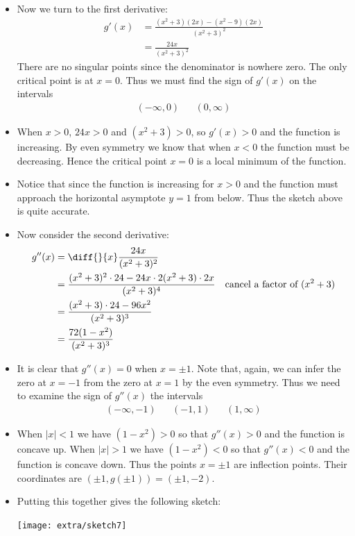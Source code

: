 \begin{eg}
\begin{itemize}
\item Now we turn to the first derivative:
\begin{align*}
  g'(x) &= \frac{(x^2+3)(2x) - (x^2-9)(2x)}{(x^2+3)^2}\\
  &= \frac{24x}{(x^2+3)^2}
\end{align*}
There are no singular points since the denominator is nowhere zero. The only critical
point is at $x=0$. Thus we must find the sign of $g'(x)$ on the intervals
\begin{align*}
  (-\infty,0) && (0,\infty)
\end{align*}
\item When $x>0$, $24x>0$ and $(x^2+3)>0$, so $g'(x)>0$ and the function is increasing.
By even symmetry we know that when $x<0$ the function must be decreasing. Hence the
critical point $x=0$ is a local minimum of the function.
\item Notice that since the function is increasing for $x>0$ and the function must
approach the horizontal asymptote $y=1$ from below. Thus the sketch above is quite
accurate.

\item Now consider the second derivative:
\begin{align*}
  g''(x) &= \diff{}{x} \frac{24x}{(x^2+3)^2}\\
  &= \frac{(x^2+3)^2 \cdot 24 - 24x\cdot 2 (x^2+3)\cdot2x}{(x^2+3)^4} & \text{cancel a
factor of $(x^2+3)$}\\
  &= \frac{(x^2+3) \cdot 24 - 96x^2}{(x^2+3)^3} \\
  &= \frac{72(1-x^2)}{(x^2+3)^3}
\end{align*}
\item It is clear that $g''(x) = 0$ when $x=\pm 1$. Note that, again, we can infer
the zero at $x=-1$ from the zero at $x=1$ by the even symmetry.  Thus we need to examine
the sign of $g''(x)$ the intervals
\begin{align*}
  (-\infty,-1)&&(-1,1)&&(1,\infty)
\end{align*}
\item When $|x|<1$ we have $(1-x^2)>0$ so that $g''(x)>0$ and the function is
concave up. When $|x|>1$ we have $(1-x^2)<0$ so that $g''(x)<0$ and the function is
concave down. Thus the points $x=\pm 1$ are inflection points. Their coordinates are
$(\pm1, g(\pm1)) =(\pm 1,-2)$.

\item Putting this together gives the following sketch:
\begin{efig}
 \begin{center}
  \texttt{[image: extra/sketch7]}
 \end{center}
\end{efig}


\end{itemize}

\end{eg}

